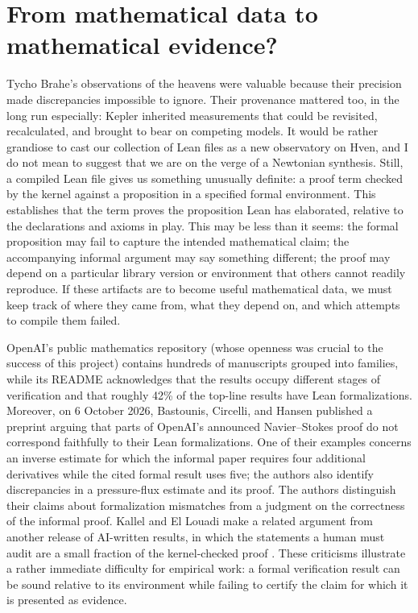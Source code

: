 \documentclass{article}
\begin{document}
\section{From mathematical data to mathematical evidence?}
Tycho Brahe's observations of the heavens were valuable because their precision made discrepancies impossible to ignore. 
Their provenance mattered too, in the long run especially: Kepler inherited measurements that could be revisited, 
recalculated, and brought to bear on competing models. It would be rather grandiose to cast our collection of Lean files as 
a new observatory on Hven, and I do not mean to suggest that we are on the verge of a Newtonian synthesis. Still, a compiled Lean file gives us something unusually definite: a proof term checked by the kernel 
against a proposition in a specified formal environment. This establishes that the term proves the proposition Lean 
has elaborated, relative to the declarations and axioms in play. This may be less than it seems: the formal 
proposition may fail to capture the intended mathematical claim; the accompanying informal argument may say 
something different; the proof may depend on a particular library version or environment that others cannot 
readily reproduce. If these artifacts are to become useful mathematical data, we must keep track of where they 
came from, what they depend on, and which attempts to compile them failed.

OpenAI's public mathematics repository (whose openness was 
crucial to the success of this project) contains hundreds of manuscripts grouped into families, while its README \textit{\parencite{openai_math}}
acknowledges that the results occupy different stages of verification and that roughly 42\% of the top-line results have 
Lean formalizations. Moreover, on 6 October 2026, Bastounis, Circelli, and Hansen \textit{\parencite{bastounis2026}} 
published a preprint arguing that parts of OpenAI's announced Navier--Stokes proof do not correspond faithfully to their 
Lean formalizations. One of their examples concerns an inverse estimate for which the informal paper requires four additional 
derivatives while the cited formal result uses five; the authors also identify discrepancies in a pressure-flux 
estimate and its proof. The authors distinguish 
their claims about formalization mismatches from a judgment on the correctness of the informal proof. Kallel and El Louadi make a related 
argument from another release of AI-written results, in which the statements a human must audit are a small fraction 
of the kernel-checked proof \textit{\parencite{kallel2026verification}}. These criticisms 
illustrate a rather immediate difficulty for empirical work: a formal verification result can be sound relative to its 
environment while failing to certify the claim for which it is presented as evidence.
\end{document}
